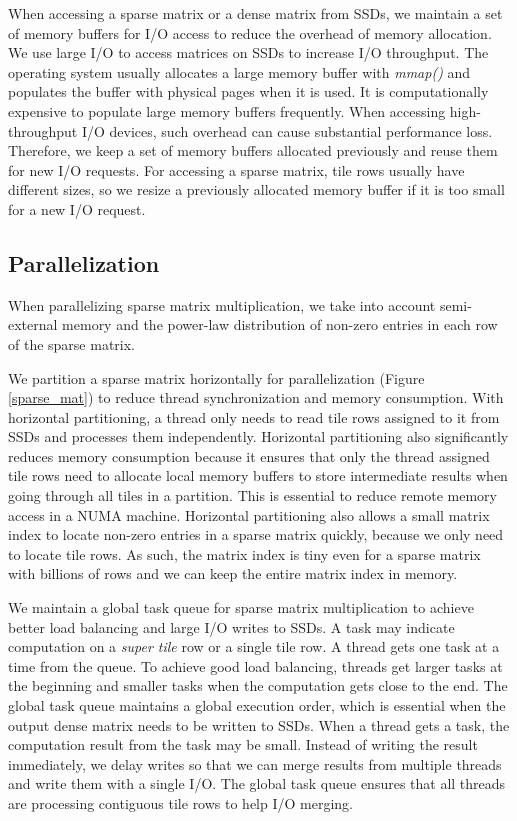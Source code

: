 When accessing a sparse matrix or a dense matrix from SSDs, we maintain a set of
memory buffers for I/O access to reduce the overhead of memory allocation.
We use large I/O to access matrices on SSDs to increase I/O throughput.
The operating system usually allocates a large memory buffer with \textit{mmap()}
and populates the buffer with physical pages when it is used. It is
computationally expensive to populate
large memory buffers frequently. When accessing high-throughput I/O devices,
such overhead can cause substantial performance loss. Therefore, we keep a set
of memory buffers allocated previously and reuse them for new I/O requests.
For accessing a sparse matrix, tile rows usually have different sizes, so we resize
a previously allocated memory buffer if it is too small for a new I/O request.

\subsection{Parallelization}
When parallelizing sparse matrix multiplication, we take into account
semi-external memory and the power-law distribution of non-zero entries
in each row of the sparse matrix.

We partition a sparse matrix horizontally for parallelization (Figure
\ref{sparse_mat}) to reduce thread synchronization and memory consumption.
With horizontal partitioning, a thread only needs to read tile rows assigned
to it from SSDs and processes them independently. Horizontal partitioning
also significantly reduces memory consumption
because it ensures that only the thread assigned tile
rows need to allocate local memory buffers to store intermediate results
when going through all tiles in a partition. This is essential to reduce
remote memory access in a NUMA
machine. Horizontal partitioning also allows a small matrix index to
locate non-zero entries in a sparse matrix quickly, because we only need to
locate tile rows. As such,
the matrix index is tiny even for a sparse matrix with billions of rows
and we can keep the entire matrix index in memory.

We maintain a global task queue for sparse matrix multiplication to achieve
better load balancing and large I/O writes to SSDs. A task may indicate
computation on a \textit{super tile} row or a single tile row.
A thread gets one task at a time from the queue. To achieve good load balancing,
threads get larger tasks at the beginning and smaller tasks when the computation
gets close to the end. The global task queue maintains a global execution
order, which is essential
when the output dense matrix needs to be written to SSDs. When a thread gets
a task, the computation result from the task may be small. Instead of
writing the result immediately, we delay writes so that we can merge
results from multiple threads and write them with a single I/O.
The global task queue ensures that all threads are processing contiguous
tile rows to help I/O merging.

